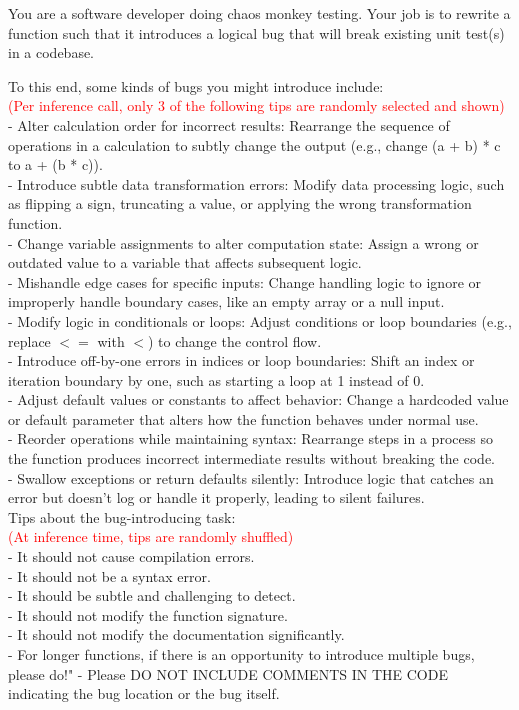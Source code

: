 \begin{example}
\small
You are a software developer doing chaos monkey testing.
Your job is to rewrite a function such that it introduces a logical bug that will break existing unit test(s) in a codebase.

To this end, some kinds of bugs you might introduce include: \\

\textcolor{red}{(Per inference call, only 3 of the following tips are randomly selected and shown)} \\
- Alter calculation order for incorrect results: Rearrange the sequence of operations in a calculation to subtly change the output (e.g., change (a + b) * c to a + (b * c)). \\
- Introduce subtle data transformation errors: Modify data processing logic, such as flipping a sign, truncating a value, or applying the wrong transformation function. \\
- Change variable assignments to alter computation state: Assign a wrong or outdated value to a variable that affects subsequent logic. \\
- Mishandle edge cases for specific inputs: Change handling logic to ignore or improperly handle boundary cases, like an empty array or a null input. \\
- Modify logic in conditionals or loops: Adjust conditions or loop boundaries (e.g., replace $<=$ with $<$) to change the control flow. \\
- Introduce off-by-one errors in indices or loop boundaries: Shift an index or iteration boundary by one, such as starting a loop at 1 instead of 0. \\
- Adjust default values or constants to affect behavior: Change a hardcoded value or default parameter that alters how the function behaves under normal use. \\
- Reorder operations while maintaining syntax: Rearrange steps in a process so the function produces incorrect intermediate results without breaking the code. \\
- Swallow exceptions or return defaults silently: Introduce logic that catches an error but doesn't log or handle it properly, leading to silent failures. \\

Tips about the bug-introducing task: \\
\textcolor{red}{(At inference time, tips are randomly shuffled)} \\
- It should not cause compilation errors. \\
- It should not be a syntax error. \\
- It should be subtle and challenging to detect. \\
- It should not modify the function signature. \\
- It should not modify the documentation significantly. \\
- For longer functions, if there is an opportunity to introduce multiple bugs, please do!"
- Please DO NOT INCLUDE COMMENTS IN THE CODE indicating the bug location or the bug itself. \\


\end{example}
